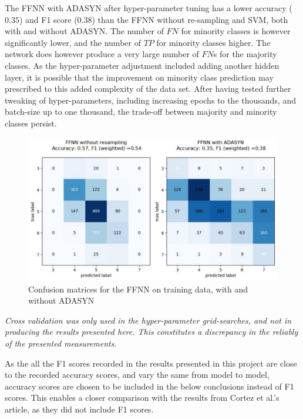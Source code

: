 \documentclass[%
oneside,                 %
final,                   %
10pt]{article}
\begin{document}
The FFNN with ADASYN after hyper-parameter tuning has a lower accuracy ($0.35$) and F1 score ($0.38$) than the FFNN without re-sampling and SVM, both with and without ADASYN. The number of $FN$ for minority classes is however significantly lower, and the number of $TP$ for minority classes higher. The network does however produce a very large number of 
$FN$s for the majority classes. As the hyper-parameter adjustment included adding another hidden layer, it is possible that the improvement on minority class prediction may prescribed to this added complexity of the data set. After having tested further tweaking of hyper-parameters, including increasing epochs to the thousands, and batch-size up to one thousand, the trade-off between majority and minority classes persist. 



\begin{figure}[!h]
        \centering 
         \includegraphics[scale=0.5]{../Results/confusions_NN.pdf} 
          \caption{Confusion matrices for the FFNN on training data, with and without ADASYN}
        \label{fig:conf_NN}   
\end{figure}  
\textit{Cross validation was only used in the hyper-parameter grid-searches, and not in producing the results presented here. This constitutes a discrepancy in the reliably of the presented measurements.}

As the all the F1 scores recorded in the results presented in this project are close to the recorded accuracy scores, and vary the same from model to model, accuracy scores are chosen to be included in the below conclusions instead of F1 scores. This enables a closer comparison with the results from Cortez et al.'s article, as they did not include F1 scores.
\end{document}
